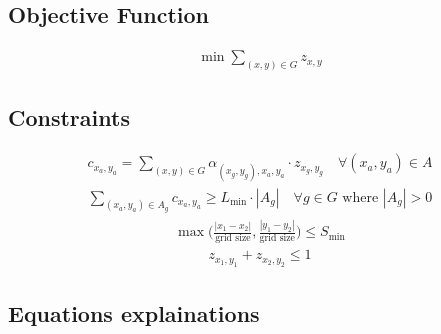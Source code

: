 \documentclass{article}
\begin{document}
\subsection{Objective Function}

\begin{align}
    \min \sum_{(x, y) \in G} z_{x, y}
\end{align}

\subsection{Constraints}

\begin{align}
    c_{x_a, y_a} = \sum_{(x, y) \in G} \alpha_{(x_g, y_g), {x_a, y_a}} \cdot z_{x_g, y_g} \quad\forall (x_a, y_a) \in A
\end{align}
\begin{align}
    \sum_{(x_a, y_a) \in A_g} c_{x_a, y_a} \geq L_{\min} \cdot |A_g| \quad\forall g \in G \text{ where } |A_g| > 0
\end{align}
\begin{align}
    \max \bigg(\frac{|x_1 - x_2|}{\text{grid size}}, \frac{|y_1 - y_2|}{\text{grid size}}\bigg) \leq S_{\min}
\end{align}
\begin{align}
    z_{x_1, y_1} + z_{x_2, y_2} \leq 1
\end{align}

\newpage

\subsection{Equations explainations}
\end{document}
